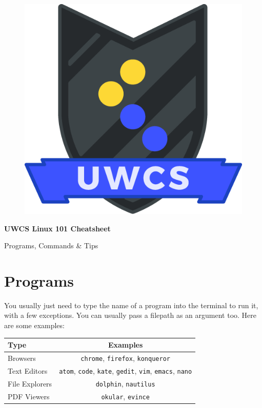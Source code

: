 \documentclass[a4paper,11pt,parskip=half-]{scrartcl}
\begin{document}
\begin{figure}
    \vspace{-10pt} %
    \includegraphics[width=0.9\linewidth]{shield.png}
    \vspace{-100pt} %
\end{figure}

\normalfont \Huge \bfseries UWCS Linux 101 Cheatsheet

\normalfont\LARGE Programs, Commands \& Tips
\normalsize

\section*{Programs}

You usually just need to type the name of a program into the terminal to run it, with a few exceptions. You can usually pass a filepath as an argument too. Here are some examples:

\centering
\begin{tabular}{l|c}
        Type & Examples \\
        \hline
        \large Browsers \normalfont & \texttt{chrome}, \texttt{firefox}, \texttt{konqueror} \\
        \large Text Editors \normalfont & \texttt{atom}, \texttt{code}, \texttt{kate}, \texttt{gedit}, \texttt{vim}, \texttt{emacs}, \texttt{nano} \\
        \large File Explorers \normalfont & \texttt{dolphin}, \texttt{nautilus} \\
        \large PDF Viewers \normalfont & \texttt{okular}, \texttt{evince} \\
\end{tabular}
\end{document}
